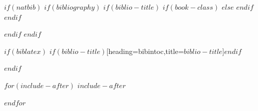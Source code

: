 \backmatter
$if(natbib)$
  $if(bibliography)$
  $if(biblio-title)$
  $if(book-class)$
  \renewcommand\bibname{$biblio-title$}
  $else$
  \renewcommand\refname{$biblio-title$}
  $endif$
  $endif$
  

  $endif$
$endif$

$if(biblatex)$
\printbibliography$if(biblio-title)$[heading=bibintoc,title={$biblio-title$}]$endif$

$endif$

$for(include-after)$
$include-after$

$endfor$


